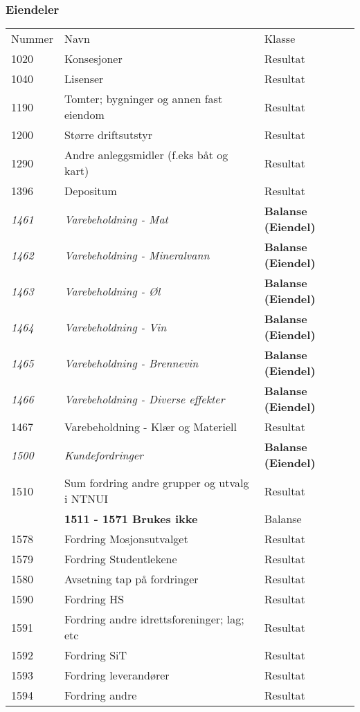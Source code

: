 \subsubsection*{Eiendeler}
\begin{table}[H]
\begin{tabular}{l l l }
Nummer & Navn & Klasse \\
1020 & Konsesjoner & Resultat\\
1040 & Lisenser & Resultat\\
1190 & Tomter; bygninger og annen fast eiendom & Resultat\\
1200 & Større driftsutstyr & Resultat\\
1290 & Andre anleggsmidler (f.eks båt og kart) & Resultat\\
1396 & Depositum & Resultat\\
\emph{1461} & \emph{Varebeholdning - Mat} & {\bfseries Balanse (Eiendel)}\\
\emph{1462} & \emph{Varebeholdning - Mineralvann} & {\bfseries Balanse (Eiendel)}\\
\emph{1463} & \emph{Varebeholdning - Øl} & {\bfseries Balanse (Eiendel)}\\
\emph{1464} & \emph{Varebeholdning - Vin} & {\bfseries Balanse (Eiendel)}\\
\emph{1465} & \emph{Varebeholdning - Brennevin} & {\bfseries Balanse (Eiendel)}\\
\emph{1466} & \emph{Varebeholdning - Diverse effekter} & {\bfseries Balanse (Eiendel)}\\
1467 & Varebeholdning - Klær og Materiell & Resultat\\
\emph{1500} & \emph{Kundefordringer} & {\bfseries Balanse (Eiendel)}\\
1510 & Sum fordring andre grupper og utvalg i NTNUI & Resultat\\
  & {\bfseries 1511 - 1571 Brukes ikke} & Balanse \\
1578 & Fordring Mosjonsutvalget & Resultat\\
1579 & Fordring Studentlekene & Resultat\\
1580 & Avsetning tap på fordringer & Resultat\\
1590 & Fordring HS & Resultat\\
1591 & Fordring andre idrettsforeninger; lag; etc & Resultat\\
1592 & Fordring SiT & Resultat\\
1593 & Fordring leverandører & Resultat\\
1594 & Fordring andre & Resultat\\

\end{tabular}
\end{table}

